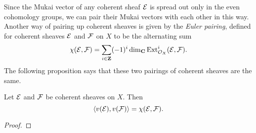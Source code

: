 Since the Mukai vector of any coherent sheaf $\mathcal E$ is spread out only in the even cohomology groups, we can pair their Mukai vectors with each other in this way. Another way of pairing up coherent sheaves is given by the \emph{Euler pairing}, defined for coherent sheaves $\mathcal E$ and $\mathcal F$ on $X$ to be the alternating sum
\begin{equation}
    \label{Euler pairing}
    \chi(\mathcal E, \mathcal F) = \sum_{i \in \mathbf Z} (-1)^i \dim_\mathbf C \operatorname{Ext}^i_{\mathcal{O}_{X}}(\mathcal E, \mathcal F).
\end{equation}
The following proposition says that these two pairings of coherent sheaves are the same.

\begin{proposition}
    \label{equler pairing = mukai pairing}
    Let $\mathcal E$ and $\mathcal F$ be coherent sheaves on $X$. Then
    \[
        \langle v(\mathcal E), v(\mathcal F) \rangle = \chi(\mathcal E, \mathcal F).
    \]
\end{proposition}

\begin{proof}
    
\end{proof}

